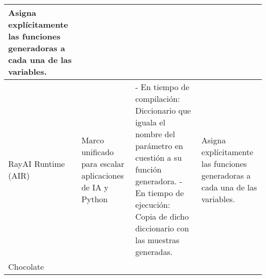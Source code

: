 \begin{longtable}{  p{2.5cm}  p{4cm}  p{6.8cm}  p{6.5cm} }
    Asigna explícitamente las funciones generadoras a cada una de las variables.                                                                                                                                                                                                                                                                                    \\
    \hline
    \rowcolor{lavender}
    RayAI Runtime (AIR)                                                                                                                                                                                                                                                                                                                                           &
    Marco unificado para escalar aplicaciones de IA y Python                                                                                                                                                                                                                                                                                                      &
    - En tiempo de compilación: Diccionario que iguala el nombre del parámetro en cuestión a su función generadora. \newline- En tiempo de ejecución: Copia de dicho diccionario con las muestras generadas.                                                                                                                                                        &
    Asigna explícitamente las funciones generadoras a cada una de las variables.                                                                                                                                                                                                                                                                                     \\
    \hline
    Chocolate                                                                                                                                                                                                                                                                                                                                                     &

\end{longtable}
